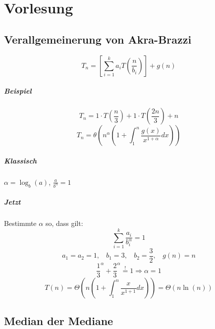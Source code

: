 \chapter{Vorlesung}


\section{Verallgemeinerung von Akra-Brazzi}

\[T_n = \left[\sum_{i=1}^k a_i T(\frac{n}{b_i}) \right] + g(n) \]
\paragraph{Beispiel}
\[T_n = 1\cdot T\left(\frac{n}{3}\right)+1\cdot T\left(\frac{2n}{3}\right) + n \]
\[T_n = \theta\left(n^{\alpha}\left(1+\int_1^n\frac{g\left(x\right)}{x^{1+\alpha}} dx\right)\right)  \]


\paragraph{Klassisch} $\alpha = \log_b(a)$, $\frac{a}{b^{\alpha}} = 1$
\paragraph{Jetzt} Bestimmte $\alpha$ so, dass gilt:
\[\sum_{i=1}^k \frac{a_i}{b_i^{\alpha}} = 1 \]
\[a_1 = a_2 = 1, ~~~~ b_1 = 3, ~~~~ b_2 = \frac{3}{2}, ~~~~ g(n) = n \]
 \[\frac{1}{3}^{\alpha} + \frac{2}{3}^{\alpha} \overset{!}{=} 1 \Rightarrow \alpha = 1 \]
\[T(n) = \Theta \left(n \left(1+\int_1^n \frac{x}{x^{1+1}} dx\right) \right) = \Theta(n\ln(n)) \]


\section{Median der Mediane}


